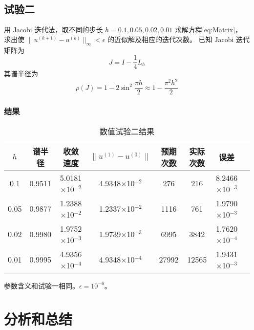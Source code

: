 \documentclass{article}
\begin{document}
\subsection{试验二}
用 Jacobi 迭代法，取不同的步长 $h=0.1,0.05,0.02,0.01$ 求解方程\eqref{eq:Matrix}，
求出使 $\|u^{(k+1)}-u^{(k)}\|_{\infty}<\epsilon$ 的近似解及相应的迭代次数。
已知 Jacobi 迭代矩阵为
\begin{equation*}
    J = I - \frac{1}{4}L_h
\end{equation*}
其谱半径为
\begin{equation*}
    \rho(J) = 1 - 2\sin^2\frac{\pi h}{2}\approx1-\frac{\pi^2h^2}{2}
\end{equation*}

\subsubsection{结果}
\begin{center}
    \begin{table}[H]
        \caption{数值试验二结果}
        \begin{tabular}{|c|c|c|c|c|c|c|c|}
        \hline
        $h$  & 谱半径  & 收敛速度                 & $\|u^{(1)}-u^{(0)}\|$ & 预期次数 & 实际次数 & 误差      \\ \hline
        0.1  & 0.9511 & 5.0181$\times$10$^{-2}$ & 4.9348$\times$10$^{-2}$ & 276     & 216    & 8.2466$\times$10$^{-3}$ \\ \hline
        0.05 & 0.9877 & 1.2388$\times$10$^{-2}$ & 1.2337$\times$10$^{-2}$ & 1116    & 761    & 1.9790$\times$10$^{-3}$ \\ \hline
        0.02 & 0.9980 & 1.9752$\times$10$^{-3}$ & 1.9739$\times$10$^{-3}$ & 6995    & 3842   & 1.7620$\times$10$^{-4}$ \\ \hline
        0.01 & 0.9995 & 4.9356$\times$10$^{-4}$ & 4.9348$\times$10$^{-4}$ & 27992   & 12565  & 1.9431$\times$10$^{-3}$ \\ \hline
        \end{tabular}
    \end{table}
\end{center}
参数含义和试验一相同。$\epsilon=10^{-6}$。

\section{分析和总结}
\end{document}
